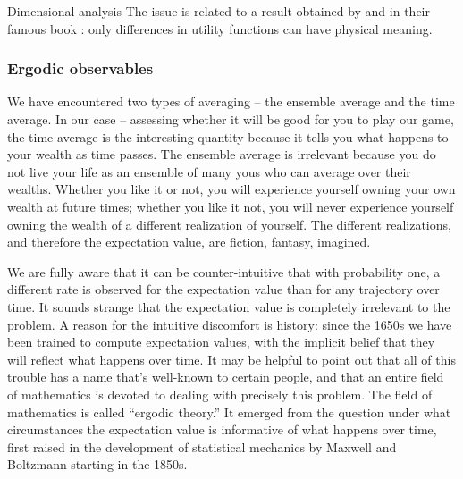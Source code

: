 \begin{excursion}{Dimensional analysis}
The issue is related to a result obtained by  and 
 in their 
famous
book \cite{vonNeumannMorgenstern1944}: 
only differences in utility functions can have physical meaning.
\end{excursion}

\subsubsection{Ergodic observables}

We have encountered two types of averaging -- the ensemble average and the
time average. In our case -- assessing whether it will be good for you to play our 
game, the time average is the interesting quantity because it tells you what happens
to your wealth as time passes. The ensemble average is irrelevant 
because you do not live your life as an ensemble of many yous who can average
over their wealths. Whether you like it or not, you will experience yourself owning 
your own wealth at future times; whether you like it not, you will never experience
yourself owning the wealth of a different realization of yourself. The different realizations,
and therefore the expectation value, are fiction, fantasy, imagined.

We are fully aware that it can be counter-intuitive that with probability one, a different
rate is observed for the expectation value than for any trajectory over time. It sounds
strange that the expectation value is completely irrelevant to the problem. A reason
for the intuitive discomfort is history: since the 1650s we have been trained to
compute expectation values, with the implicit belief that they will reflect what happens
over time. It may be helpful to point out that all of this trouble has a name that's well-known
to certain people, and that an entire field of mathematics is devoted to dealing with
precisely this problem. The field of mathematics is called ``ergodic theory.'' It emerged
from the question under what circumstances the expectation value is informative 
of what happens over time, first raised in the development of statistical mechanics by Maxwell and 
Boltzmann starting in the 1850s. 


